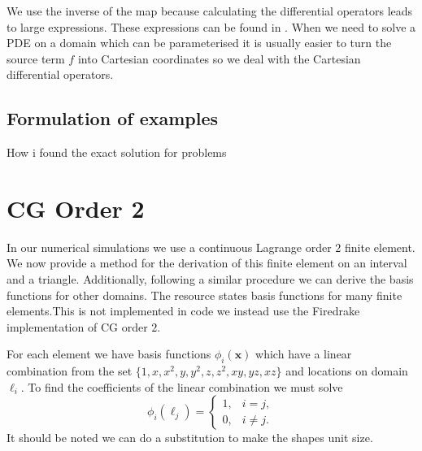 \documentclass[12pt,a4paper]{article}
\begin{document}
We use the inverse of the map because calculating the differential operators leads to large expressions. These expressions can be found in \cite{}. When we need to solve a PDE on a domain which can be parameterised it is usually easier to turn the source term $f$ into Cartesian coordinates so we deal with the Cartesian differential operators.

\subsection{Formulation of examples}
How i found the exact solution for problems 
\section{CG Order 2}
In our numerical simulations we use a continuous Lagrange order $2$ finite element. We now provide a method for the derivation of this finite element on an interval and a triangle. Additionally, following a similar procedure we can derive the basis functions for other domains. The resource \cite{} states basis functions for many finite elements.This is not implemented in code we instead use the Firedrake implementation of CG order $2$. 

For each element we have basis functions $\phi_i(\mathbf{x})$ which have a linear combination from the set $\{1, x, x^2, y, y^2, z, z^2, xy, yz, xz\}$ and locations on domain $\ell_i$.  To find the coefficients of the linear combination we must solve
\begin{equation} \label{CG_eq}
\phi_i(\ell_j) =
\begin{cases}
1, &i=j,\\
0, &i\neq j.
\end{cases}
\end{equation}
It should be noted we can do a substitution to make the shapes unit size.
\end{document}
